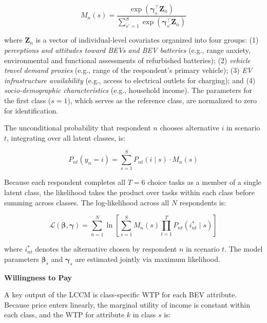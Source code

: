 \documentclass[a4paper,fleqn]{cas-sc}   %
\begin{document}
\begin{equation}
    M_n(s) = \frac{\exp\!\left(\boldsymbol{\gamma}_s^{\top} \mathbf{Z}_n\right)}{\displaystyle\sum_{s'=1}^{S} \exp\!\left(\boldsymbol{\gamma}_{s'}^{\top} \mathbf{Z}_n\right)}
    \label{eq:membership}
\end{equation}

\noindent where $\mathbf{Z}_n$ is a vector of individual-level covariates organized into four groups: (1) \textit{perceptions and attitudes toward BEVs and BEV batteries} (e.g., range anxiety, environmental and functional assessments of refurbished batteries); (2) \textit{vehicle travel demand proxies} (e.g., range of the respondent's primary vehicle); (3) \textit{EV infrastructure availability} (e.g., access to electrical outlets for charging); and (4) \textit{socio-demographic characteristics} (e.g., household income). The parameters for the first class ($s = 1$), which serves as the reference class, are normalized to zero for identification.

The unconditional probability that respondent $n$ chooses alternative $i$ in scenario $t$, integrating over all latent classes, is:

\begin{equation}
    P_{nt}(y_n = i) = \sum_{s=1}^{S} P_{nt}(i \mid s) \cdot M_n(s)
    \label{eq:unconditional}
\end{equation}

Because each respondent completes all $T = 6$ choice tasks as a member of a single latent class, the likelihood takes the product over tasks within each class before summing across classes. The log-likelihood across all $N$ respondents is:

\begin{equation}
    \mathcal{L}(\boldsymbol{\beta}, \boldsymbol{\gamma}) = \sum_{n=1}^{N} \ln \left[ \sum_{s=1}^{S} M_n(s) \prod_{t=1}^{T} P_{nt}(i_{nt}^* \mid s) \right]
    \label{eq:loglik}
\end{equation}

\noindent where $i_{nt}^*$ denotes the alternative chosen by respondent $n$ in scenario $t$. The model parameters $\boldsymbol{\beta}_s$ and $\boldsymbol{\gamma}_s$ are estimated jointly via maximum likelihood.

\vspace{\baselineskip}
\noindent \textbf{Willingness to Pay} \par

A key output of the LCCM is class-specific WTP for each BEV attribute. Because price enters linearly, the marginal utility of income is constant within each class, and the WTP for attribute $k$ in class $s$ is:
\end{document}
